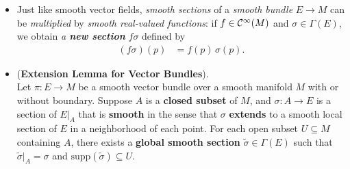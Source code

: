 \documentclass[11pt]{article}
\begin{document}
\begin{itemize}
\item \begin{remark}
Just like smooth vector fields, \emph{smooth sections} of a \emph{smooth bundle} $E \rightarrow M$  can be \emph{multiplied} by \emph{smooth real-valued functions}: if $f \in {\mathcal C}^{\infty}(M)$ and $\sigma \in \Gamma(E)$, we obtain \emph{a \textbf{new section}} $f\sigma$ defined by
\begin{align*}
(f\sigma)(p) &= f(p)\,\sigma(p).
\end{align*}
\end{remark}

\item \begin{lemma}\label{lem: ext_vector_bundle} (\textbf{Extension Lemma for Vector Bundles}).\\
Let $\pi: E \rightarrow M$ be a smooth vector bundle over a smooth manifold $M$ with or without boundary. Suppose $A$ is a \textbf{closed subset} of $M$, and $\sigma: A \rightarrow E$ is a section of $E|_{A}$ that is \textbf{smooth} in the sense that $\sigma$ \textbf{extends} to a smooth local section of $E$ in a neighborhood of each
point. For each open subset $U \subseteq M$ containing $A$, there exists a \textbf{global smooth section} $\widetilde{\sigma} \in \Gamma(E)$ such that $\widetilde{\sigma}|_{A} = \sigma$ and $\text{supp}(\widetilde{\sigma}) \subseteq U$. 
\end{lemma}
\end{itemize}
\end{document}
